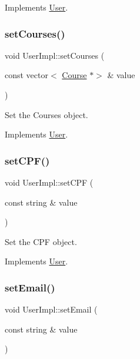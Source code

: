 Implements \hyperlink{classUser_a461783a03e5a694a2cdd80fba7b18459}{User}.

\mbox{\label{classUserImpl_a0b01431638678ab1f7e39202c2374e4e}} 
\subsubsection{\texorpdfstring{set\+Courses()}{setCourses()}}
{\footnotesize\ttfamily void User\+Impl\+::set\+Courses (\begin{DoxyParamCaption}\item[{const vector$<$ \hyperlink{classCourse}{Course} $\ast$$>$ \&}]{value }\end{DoxyParamCaption})\hspace{0.3cm}{\ttfamily [virtual]}}



Set the Courses object. 



Implements \hyperlink{classUser_a1b97c41fca71b2839d8acc57e9d006b2}{User}.

\mbox{\label{classUserImpl_a9964fc4ed651ce945f663cb4df8e042b}} 
\subsubsection{\texorpdfstring{set\+C\+P\+F()}{setCPF()}}
{\footnotesize\ttfamily void User\+Impl\+::set\+C\+PF (\begin{DoxyParamCaption}\item[{const string \&}]{value }\end{DoxyParamCaption})\hspace{0.3cm}{\ttfamily [virtual]}}



Set the C\+PF object. 



Implements \hyperlink{classUser_ac10d34adddaa80cb544eab7c5b1227f5}{User}.

\mbox{\label{classUserImpl_abbd8347c11bd2ea93d37ec123b42dc6b}} 
\subsubsection{\texorpdfstring{set\+Email()}{setEmail()}}
{\footnotesize\ttfamily void User\+Impl\+::set\+Email (\begin{DoxyParamCaption}\item[{const string \&}]{value }\end{DoxyParamCaption})\hspace{0.3cm}{\ttfamily [virtual]}}



